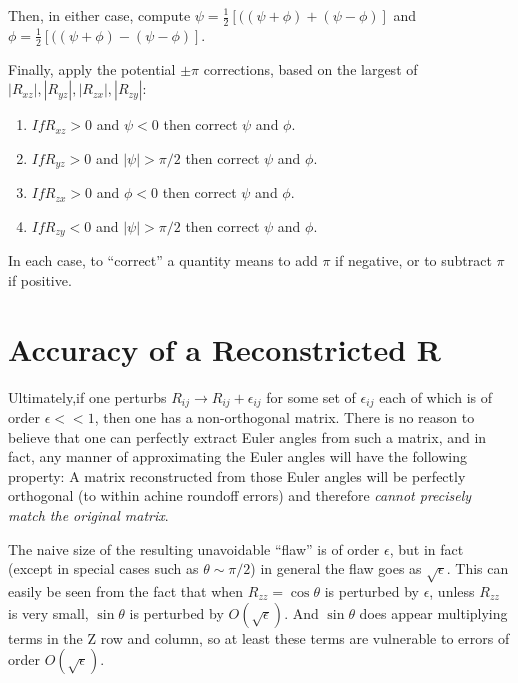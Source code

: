 \noindent
Then, in either case, compute
$\psi = \frac{1}{2} \left[ ( (\psi + \phi) + (\psi - \phi) \right]$ and
$\phi = \frac{1}{2} \left[ ( (\psi + \phi) - (\psi - \phi) \right]$.

\noindent
Finally, apply the potential $\pm \pi$ corrections, based on the largest of 
$|R_{xz}|,|R_{yz}|,|R_{zx}|,|R_{zy}|$: 
\begin{enumerate}
\item
$If R_{xz} > 0$ and $\psi < 0$ then correct $\psi$ and $\phi$.
\item
$If R_{yz} > 0$ and $|\psi| > \pi/2$ then correct $\psi$ and $\phi$.
\item
$If R_{zx} > 0$ and $\phi < 0$ then correct $\psi$ and $\phi$.
\item
$If R_{zy} < 0$ and $|\psi| > \pi/2$ then correct $\psi$ and $\phi$.
\end{enumerate}
\noindent
In each case, to ``correct'' a quantity means to add $\pi$ if negative, or to
subtract $\pi$ if positive.

\section{Accuracy of a Reconstricted R}

Ultimately,if one perturbs 
$R_{ij} \rightarrow R_{ij}+\epsilon_{ij}$ for some set of  
$\epsilon_{ij}$ each of which is of order $\epsilon << 1$,
then one has a non-orthogonal matrix.
There is no reason to believe that one can perfectly extract Euler angles
from such a matrix, and in fact, any manner of approximating the Euler angles
will have the following property:
A matrix reconstructed from those Euler angles will be perfectly orthogonal
(to within achine roundoff errors) and therefore {\em cannot precisely 
match the original matrix}.

The naive size of the resulting unavoidable ``flaw'' is of order 
$\epsilon$, but in fact (except in special cases such as $\theta \sim \pi/2$)
in general the flaw goes as $\sqrt{\epsilon}$.  This can easily be seen
from the fact that when $R_{zz} = \cos \theta $ 
is perturbed by $\epsilon$, unless
$R_{zz}$ is very small, $\sin \theta$ is perturbed by $O(\sqrt{\epsilon})$.
And $\sin \theta$  does appear multiplying terms in the Z row and column, 
so at least these terms are vulnerable to errors of order $O(\sqrt{\epsilon})$.
 


